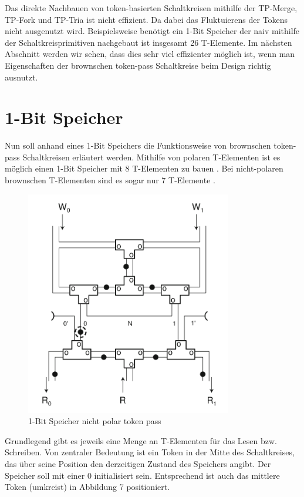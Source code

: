 \documentclass[11pt,a4paper]{article}
\begin{document}
%
Das direkte Nachbauen von token-basierten Schaltkreisen mithilfe
der TP-Merge, TP-Fork und TP-Tria ist nicht effizient.
%
Da dabei das Fluktuierens der Tokens nicht ausgenutzt wird.
%
Beispielsweise benötigt ein 1-Bit Speicher der naiv mithilfe der 
Schaltkreisprimitiven nachgebaut ist insgesamt 26 T-Elemente.
%
Im nächsten Abschnitt werden wir sehen, dass dies sehr viel effizienter möglich
ist, wenn man Eigenschaften der brownschen token-pass Schaltkreise
beim Design richtig ausnutzt.



\section{1-Bit Speicher}
Nun soll anhand eines 1-Bit Speichers die Funktionsweise von brownschen 
token-pass Schaltkreisen erläutert werden.
%
Mithilfe von polaren T-Elementen ist es möglich einen 1-Bit Speicher mit 8
T-Elementen zu bauen \cite{Peper_Fundamentals_2013}. 
%
Bei nicht-polaren brownschen T-Elementen sind es sogar
nur 7  T-Elemente \cite{Peper_nonPolar_2018}.

\begin{figure}[h]
      \centering
      \includegraphics[width=9cm]{bilder/NonPolarMemory.png} 
      \caption{1-Bit Speicher nicht polar token pass}
\end{figure}

Grundlegend gibt es jeweils eine Menge an T-Elementen für das Lesen bzw. 
Schreiben.
%
Von zentraler Bedeutung ist ein Token in der Mitte des Schaltkreises, das über 
seine Position den derzeitigen Zustand des Speichers angibt.
%
Der Speicher soll mit einer 0 initialisiert sein.
%
Entsprechend ist auch das mittlere Token (umkreist) in Abbildung 7 positioniert.
\end{document}
